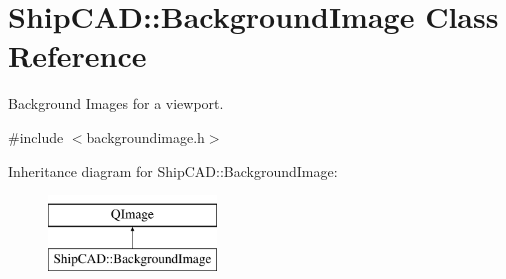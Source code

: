 \hypertarget{classShipCAD_1_1BackgroundImage}{\section{Ship\-C\-A\-D\-:\-:Background\-Image Class Reference}
\label{classShipCAD_1_1BackgroundImage}
}


Background Images for a viewport.  




{\ttfamily \#include $<$backgroundimage.\-h$>$}

Inheritance diagram for Ship\-C\-A\-D\-:\-:Background\-Image\-:\begin{figure}[H]
\begin{center}
\leavevmode
\includegraphics[height=2.000000cm]{classShipCAD_1_1BackgroundImage}
\end{center}
\end{figure}
